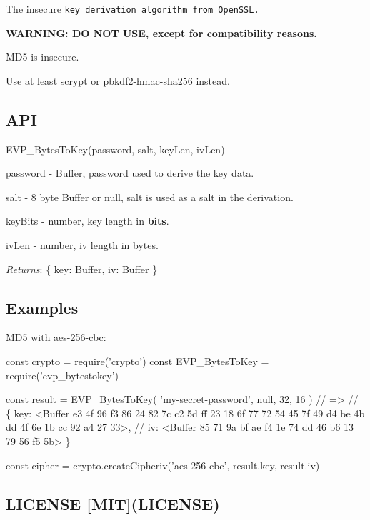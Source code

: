 \href{https://www.npmjs.org/package/evp_bytestokey}{\tt } \href{https://travis-ci.org/crypto-browserify/EVP_BytesToKey}{\tt } \href{https://david-dm.org/crypto-browserify/EVP_BytesToKey#info=dependencies}{\tt }

\href{https://github.com/feross/standard}{\tt }

The insecure \href{https://wiki.openssl.org/index.php/Manual:EVP_BytesToKey(3)}{\tt key derivation algorithm from Open\+S\+SL.}

{\bfseries W\+A\+R\+N\+I\+NG\+: DO N\+OT U\+SE, except for compatibility reasons.}

M\+D5 is insecure.

Use at least {\ttfamily scrypt} or {\ttfamily pbkdf2-\/hmac-\/sha256} instead.

\subsection*{A\+PI}

{\ttfamily E\+V\+P\+\_\+\+Bytes\+To\+Key(password, salt, key\+Len, iv\+Len)}


\begin{DoxyItemize}
\item {\ttfamily password} -\/ {\ttfamily Buffer}, password used to derive the key data.
\item {\ttfamily salt} -\/ 8 byte {\ttfamily Buffer} or {\ttfamily null}, salt is used as a salt in the derivation.
\item {\ttfamily key\+Bits} -\/ {\ttfamily number}, key length in {\bfseries bits}.
\item {\ttfamily iv\+Len} -\/ {\ttfamily number}, iv length in bytes.
\end{DoxyItemize}

{\itshape Returns}\+: {\ttfamily \{ key\+: Buffer, iv\+: Buffer \}}

\subsection*{Examples}

M\+D5 with {\ttfamily aes-\/256-\/cbc}\+:


\begin{DoxyCode}
const crypto = require('crypto')
const EVP\_BytesToKey = require('evp\_bytestokey')

const result = EVP\_BytesToKey(
  'my-secret-password',
  null,
  32,
  16
)
// =>
// \{ key: <Buffer e3 4f 96 f3 86 24 82 7c c2 5d ff 23 18 6f 77 72 54 45 7f 49 d4 be 4b dd 4f 6e 1b cc 92 a4
       27 33>,
//   iv: <Buffer 85 71 9a bf ae f4 1e 74 dd 46 b6 13 79 56 f5 5b> \}

const cipher = crypto.createCipheriv('aes-256-cbc', result.key, result.iv)
\end{DoxyCode}


\subsection*{L\+I\+C\+E\+N\+SE \mbox{[}M\+IT\mbox{]}(L\+I\+C\+E\+N\+SE)}